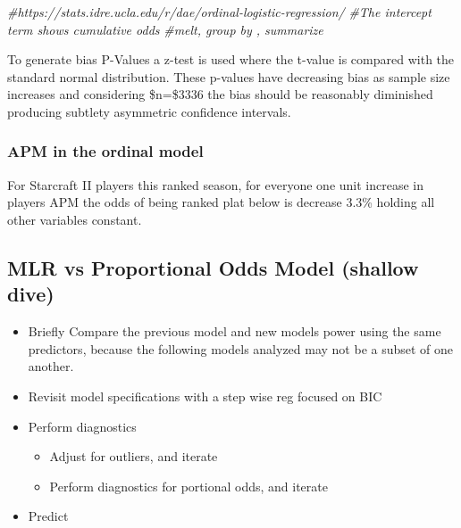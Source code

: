 \documentclass[]{article}
\newenvironment{Shaded}{\begin{snugshade}}{\end{snugshade}}
\newcommand{\CommentTok}[1]{\textcolor[rgb]{0.56,0.35,0.01}{\textit{#1}}}
\providecommand{\tightlist}{%
  \setlength{\itemsep}{0pt}\setlength{\parskip}{0pt}}
\begin{document}
\begin{Shaded}
\begin{Highlighting}[]
\CommentTok{#https://stats.idre.ucla.edu/r/dae/ordinal-logistic-regression/}
\CommentTok{#The intercept term shows cumulative odds}
\CommentTok{#melt, group by , summarize}
\end{Highlighting}
\end{Shaded}

To generate bias P-Values a z-test is used where the t-value is compared
with the standard normal distribution. These p-values have decreasing
bias as sample size increases and considering \$n=\$3336 the bias should
be reasonably diminished producing subtlety asymmetric confidence
intervals.

\hypertarget{apm-in-the-ordinal-model}{%
\subsubsection{APM in the ordinal
model}\label{apm-in-the-ordinal-model}}

For Starcraft II players this ranked season, for everyone one unit
increase in players APM the odds of being ranked plat below is decrease
3.3\% holding all other variables constant.

\begin{Shaded}
\end{Shaded}

\hypertarget{mlr-vs-proportional-odds-model-shallow-dive}{%
\subsection{MLR vs Proportional Odds Model (shallow
dive)}\label{mlr-vs-proportional-odds-model-shallow-dive}}

\begin{itemize}
\tightlist
\item
  Briefly Compare the previous model and new models power using the same
  predictors, because the following models analyzed may not be a subset
  of one another.
\item
  Revisit model specifications with a step wise reg focused on BIC
\item
  Perform diagnostics

  \begin{itemize}
  \tightlist
  \item
    Adjust for outliers, and iterate
  \item
    Perform diagnostics for portional odds, and iterate
  \end{itemize}
\item
  Predict
\end{itemize}
\end{document}
